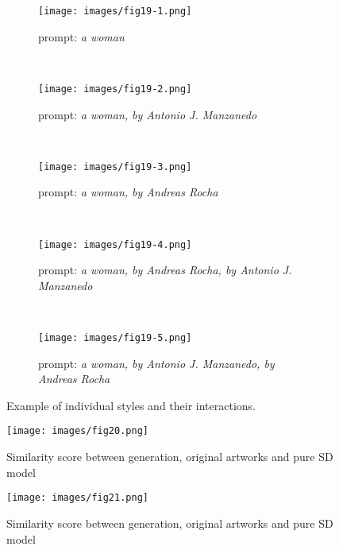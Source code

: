 \documentclass[12pt, letterpaper]{article}
\begin{document}
\begin{figure}[h]
    \centering

    \begin{subfigure}{0.8\textwidth}
        \centering
        \texttt{[image: images/fig19-1.png]}
        \caption{prompt: \textit{a woman}}
        \label{fig19:sub1}
    \end{subfigure}
    \\

    \begin{subfigure}{0.8\textwidth}
        \centering
        \texttt{[image: images/fig19-2.png]}
        \caption{prompt: \textit{a woman, by Antonio J. Manzanedo}}
        \label{fig19:sub2}
    \end{subfigure}
    \\
    
    \begin{subfigure}{0.8\textwidth}
        \centering
        \texttt{[image: images/fig19-3.png]}
        \caption{prompt: \textit{a woman, by Andreas Rocha}}
        \label{fig19:sub3}
    \end{subfigure}
    \\
    
    \begin{subfigure}{0.8\textwidth}
        \centering
        \texttt{[image: images/fig19-4.png]}
        \caption{prompt: \textit{a woman, by Andreas Rocha, by Antonio J. Manzanedo}}
        \label{fig19:sub4}
    \end{subfigure}
    \\
   
    \begin{subfigure}{0.8\textwidth}
        \centering
        \texttt{[image: images/fig19-5.png]}
        \caption{prompt: \textit{a woman, by Antonio J. Manzanedo, by Andreas Rocha}}
        \label{fig19:sub5}
    \end{subfigure}    

    \caption{Example of individual styles and their interactions.}
    \label{fig19:stacked_images}
\end{figure}

\begin{figure}[h]
    \centering
    \begin{minipage}{0.45\textwidth}
        \centering
        \texttt{[image: images/fig20.png]}
        \caption{Similarity score between generation, original artworks and pure SD model}
        \label{fig20:image1}
    \end{minipage}\hfill
    \begin{minipage}{0.45\textwidth}
        \centering
        \texttt{[image: images/fig21.png]}
        \caption{Similarity score between generation, original artworks and pure SD model}
        \label{fig21:image1}
    \end{minipage}
\end{figure}
\end{document}
